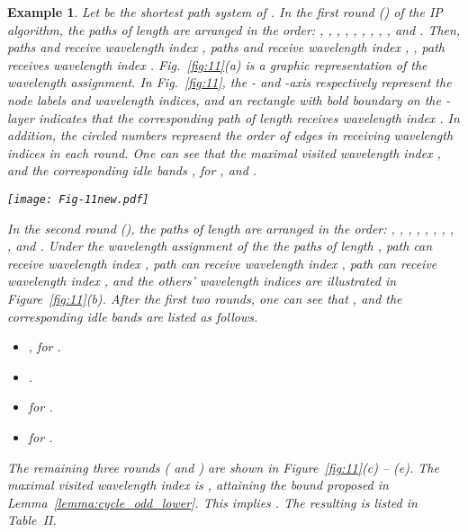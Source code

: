 \documentclass[journal,draftcls,onecolumn,12pt,twoside]{IEEEtran}
\newtheorem{example}{Example}
\begin{document}
\begin{example}
{\rm 
Let  be the shortest path system of .
In the first round () of the IP algorithm, the  paths of length  are arranged in the order:  , , , , , , , , ,  and .
Then, paths  and  receive wavelength index , paths  and  receive wavelength index ,  , path  receives wavelength index .
Fig.~\ref{fig:11}(a) is a graphic representation of the wavelength assignment.
In Fig.~\ref{fig:11}, the - and -axis respectively represent the node labels and wavelength indices, and an  rectangle with bold boundary on the -layer indicates that the corresponding path of length  receives wavelength index .
In addition, the circled numbers represent the order of edges in receiving wavelength indices in each round.
One can see that the maximal visited wavelength index , and the corresponding idle bands , for , and .

\begin{figure*}\centering
\texttt{[image: Fig-11new.pdf]}
\caption{A round-by-round illustration of Algorithm~\ref{alg:GGP} for .} \label{fig:11}
\end{figure*}

In the second round (), the  paths of length  are arranged in the order:  , , , , , , , , ,  and .
Under the wavelength assignment of the the paths of length , path  can receive wavelength index , path  can receive wavelength index , path  can receive wavelength index , and the others' wavelength indices are illustrated in Figure~\ref{fig:11}(b).
After the first two rounds, one can see that , and the corresponding idle bands are listed as follows.
\begin{itemize}
\item , for .
\item .
\item  for .
\item  for .
\end{itemize}
The remaining three rounds ( and ) are shown in Figure~\ref{fig:11}(c) -- (e).
The maximal visited wavelength index is , attaining the bound proposed in Lemma~\ref{lemma:cycle_odd_lower}.
This implies .
The resulting  is listed in Table~II.  }
\end{example}
\end{document}

